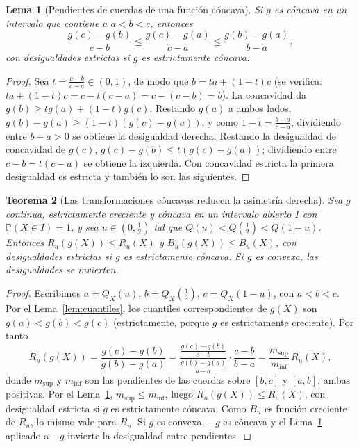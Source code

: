 \documentclass[11pt]{article}
\newtheorem{teorema}{Teorema}[section]
\newtheorem{lema}[teorema]{Lema}
\theoremstyle{definition}
\theoremstyle{remark}
\newcommand{\Prob}{\mathbb{P}}
\begin{document}
\begin{lema}[Pendientes de cuerdas de una función cóncava]\label{lem:cuerdas}
\noindent Si $g$ es cóncava en un intervalo que contiene a $a<b<c$, entonces
\[
\frac{g(c)-g(b)}{c-b}\le\frac{g(c)-g(a)}{c-a}\le\frac{g(b)-g(a)}{b-a},
\]
con desigualdades estrictas si $g$ es estrictamente cóncava.
\end{lema}
\begin{proof}
\noindent Sea $t=\frac{c-b}{c-a}\in(0,1)$, de modo que $b=ta+(1-t)c$ (se verifica: $ta+(1-t)c=c-t(c-a)=c-(c-b)=b$). La concavidad da $g(b)\ge tg(a)+(1-t)g(c)$. Restando $g(a)$ a ambos lados, $g(b)-g(a)\ge(1-t)(g(c)-g(a))$, y como $1-t=\frac{b-a}{c-a}$, dividiendo entre $b-a>0$ se obtiene la desigualdad derecha. Restando la desigualdad de concavidad de $g(c)$, $g(c)-g(b)\le t(g(c)-g(a))$; dividiendo entre $c-b=t(c-a)$ se obtiene la izquierda. Con concavidad estricta la primera desigualdad es estricta y también lo son las siguientes.
\end{proof}

\begin{teorema}[Las transformaciones cóncavas reducen la asimetría derecha]\label{teo:concava}
\noindent Sea $g$ continua, estrictamente creciente y cóncava en un intervalo abierto $I$ con $\Prob(X\in I)=1$, y sea $u\in(0,\frac12)$ tal que $Q(u)<Q(\frac12)<Q(1-u)$. Entonces $R_u(g(X))\le R_u(X)$ y $B_u(g(X))\le B_u(X)$, con desigualdades estrictas si $g$ es estrictamente cóncava. Si $g$ es convexa, las desigualdades se invierten.
\end{teorema}
\begin{proof}
\noindent Escribimos $a=Q_X(u)$, $b=Q_X(\frac12)$, $c=Q_X(1-u)$, con $a<b<c$. Por el Lema~\ref{lem:cuantiles}, los cuantiles correspondientes de $g(X)$ son $g(a)<g(b)<g(c)$ (estrictamente, porque $g$ es estrictamente creciente). Por tanto
\[
R_u(g(X))=\frac{g(c)-g(b)}{g(b)-g(a)}=\frac{\frac{g(c)-g(b)}{c-b}}{\frac{g(b)-g(a)}{b-a}}\cdot\frac{c-b}{b-a}=\frac{m_{\mathrm{sup}}}{m_{\mathrm{inf}}}\,R_u(X),
\]
donde $m_{\mathrm{sup}}$ y $m_{\mathrm{inf}}$ son las pendientes de las cuerdas sobre $[b,c]$ y $[a,b]$, ambas positivas. Por el Lema~\ref{lem:cuerdas}, $m_{\mathrm{sup}}\le m_{\mathrm{inf}}$, luego $R_u(g(X))\le R_u(X)$, con desigualdad estricta si $g$ es estrictamente cóncava. Como $B_u$ es función creciente de $R_u$, lo mismo vale para $B_u$. Si $g$ es convexa, $-g$ es cóncava y el Lema~\ref{lem:cuerdas} aplicado a $-g$ invierte la desigualdad entre pendientes.
\end{proof}
\end{document}

